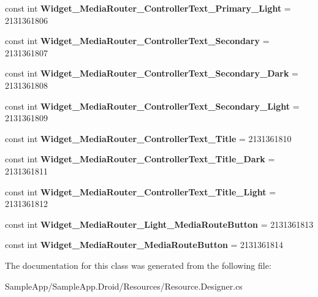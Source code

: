 \begin{DoxyCompactItemize}
\mbox{\label{class_sample_app_1_1_droid_1_1_resource_1_1_style_aaba2bcf057233efe92d9a203967cc6ea}} 
const int {\bfseries Widget\+\_\+\+Media\+Router\+\_\+\+Controller\+Text\+\_\+\+Primary\+\_\+\+Light} = 2131361806
\item 
\mbox{\label{class_sample_app_1_1_droid_1_1_resource_1_1_style_a71e65476cfb7aeed31f42156931e05a9}} 
const int {\bfseries Widget\+\_\+\+Media\+Router\+\_\+\+Controller\+Text\+\_\+\+Secondary} = 2131361807
\item 
\mbox{\label{class_sample_app_1_1_droid_1_1_resource_1_1_style_ab0d9f63311cefcbb749e7e15e8b1bd18}} 
const int {\bfseries Widget\+\_\+\+Media\+Router\+\_\+\+Controller\+Text\+\_\+\+Secondary\+\_\+\+Dark} = 2131361808
\item 
\mbox{\label{class_sample_app_1_1_droid_1_1_resource_1_1_style_a1872f72c2a3e18ababaaf5d6a115ed50}} 
const int {\bfseries Widget\+\_\+\+Media\+Router\+\_\+\+Controller\+Text\+\_\+\+Secondary\+\_\+\+Light} = 2131361809
\item 
\mbox{\label{class_sample_app_1_1_droid_1_1_resource_1_1_style_aa7f1ec568e5aee5adeb162dc19f8ae81}} 
const int {\bfseries Widget\+\_\+\+Media\+Router\+\_\+\+Controller\+Text\+\_\+\+Title} = 2131361810
\item 
\mbox{\label{class_sample_app_1_1_droid_1_1_resource_1_1_style_a7f2f5270a8e3ee643ae86b8d8e602609}} 
const int {\bfseries Widget\+\_\+\+Media\+Router\+\_\+\+Controller\+Text\+\_\+\+Title\+\_\+\+Dark} = 2131361811
\item 
\mbox{\label{class_sample_app_1_1_droid_1_1_resource_1_1_style_abfef45edf7250b0c11a4abf605c55eb3}} 
const int {\bfseries Widget\+\_\+\+Media\+Router\+\_\+\+Controller\+Text\+\_\+\+Title\+\_\+\+Light} = 2131361812
\item 
\mbox{\label{class_sample_app_1_1_droid_1_1_resource_1_1_style_a72d9ce28b85bab9c3c280a2ef5de5aa6}} 
const int {\bfseries Widget\+\_\+\+Media\+Router\+\_\+\+Light\+\_\+\+Media\+Route\+Button} = 2131361813
\item 
\mbox{\label{class_sample_app_1_1_droid_1_1_resource_1_1_style_a6ae3ab097bc784d6eb9953f9b0e09825}} 
const int {\bfseries Widget\+\_\+\+Media\+Router\+\_\+\+Media\+Route\+Button} = 2131361814
\end{DoxyCompactItemize}


The documentation for this class was generated from the following file\+:\begin{DoxyCompactItemize}
\item 
Sample\+App/\+Sample\+App.\+Droid/\+Resources/Resource.\+Designer.\+cs\end{DoxyCompactItemize}
